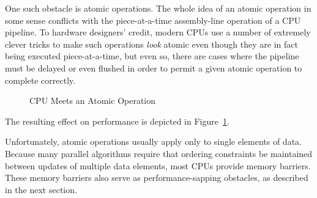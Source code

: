 One such obstacle is atomic operations.
The whole idea of an atomic operation in some sense conflicts with
the piece-at-a-time assembly-line operation of a CPU pipeline.
To hardware designers' credit, modern CPUs use a number of extremely clever
tricks to make such operations \emph{look} atomic even though they
are in fact being executed piece-at-a-time, but even so, there are
cases where the pipeline must be delayed or even flushed in order to
permit a given atomic operation to complete correctly.

\begin{figure}[htb]
\begin{center}
\end{center}
\caption{CPU Meets an Atomic Operation}
\label{fig:cpu:CPU Meets an Atomic Operation}
\end{figure}

The resulting effect on performance is depicted in
Figure~\ref{fig:cpu:CPU Meets an Atomic Operation}.

Unfortunately, atomic operations usually apply only to single elements
of data.
Because many parallel algorithms require that ordering constraints
be maintained between updates of multiple data elements, most CPUs
provide memory barriers.
These memory barriers also serve as performance-sapping obstacles,
as described in the next section.

